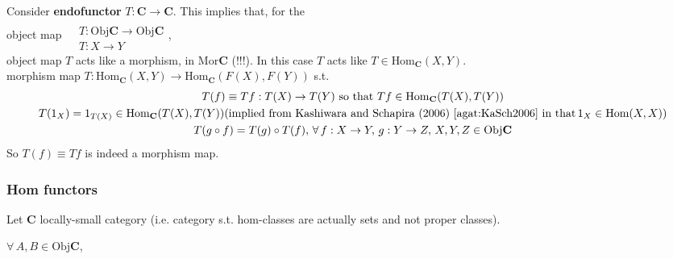 \begin{definition}[Endofunctor]\label{agat:Def:Endofunctor}
Consider \textbf{endofunctor} $T : \mathbf{C} \to \mathbf{C}$. This implies that, for the \\

object map $\begin{aligned} & \quad \\ 
	& T : \text{Obj}{\mathbf{C}} \to \text{Obj}{\mathbf{C}} \\ 
	& T : X \to Y \end{aligned}$, \\
	
	object map $T$ acts like a morphism, in $\text{Mor}\mathbf{C}$ (!!!). In this case $T$ acts like $T\in \text{Hom}_{\mathbf{C}}(X, Y)$.  \\
	
	morphism map $T: \text{Hom}_{\mathbf{C}}(X, Y) \to \text{Hom}_{\mathbf{C}}(F(X), F(Y))$ s.t. 
	\begin{equation}
	\begin{gathered} 
		T(f) \equiv Tf:T(X) \to T(Y) \text{ so that } Tf \in \text{Hom}_{\mathbf{C}}(T(X), T(Y))  \\
		T(1_X) = 1_{T(X)} \in \text{Hom}_{\mathbf{C}}(T(X), T(Y)) (\text{implied from Kashiwara and Schapira (2006) \cite{agat:KaSch2006} in that} \, 1_X \in \text{Hom}(X,X)) \\
		T(g\circ f) = T(g) \circ T(f), \, \forall \, f:X \to Y, \, g:Y \to Z, \, X,Y,Z\in \text{Obj}{\mathbf{C}}
	\end{gathered} 
	\end{equation} 
	So $T(f) \equiv Tf$ is indeed a morphism map.

\end{definition}

\subsubsection{Hom functors}

Let $\mathbf{C}$ locally-small category (i.e. category s.t. hom-classes are actually sets and not proper classes).

$\forall \, A, B \in \text{Obj}\mathbf{C}$, 

